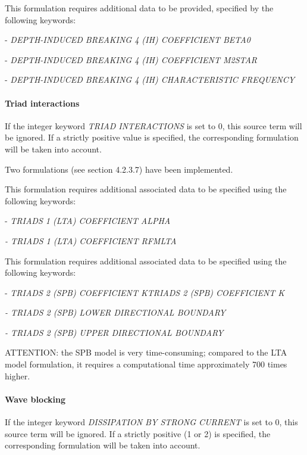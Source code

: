  This formulation requires additional data to be provided, specified by the following keywords:

 - \textit{DEPTH-INDUCED BREAKING 4 (IH) COEFFICIENT BETA0}

 - \textit{DEPTH-INDUCED BREAKING 4 (IH) COEFFICIENT M2STAR}

 - \textit{DEPTH-INDUCED BREAKING 4 (IH) CHARACTERISTIC FREQUENCY}

\paragraph{ Triad interactions}

 If the integer keyword \textit{TRIAD INTERACTIONS} is set to 0, this source term will be ignored. If a strictly positive value is specified, the corresponding formulation will be taken into account.

 Two formulations (see section 4.2.3.7) have been implemented.

 \textbf{}

 This formulation requires additional associated data to be specified using the following keywords:

 - \textit{TRIADS 1 (LTA) COEFFICIENT ALPHA }

 \textit{- TRIADS 1 (LTA) COEFFICIENT RFMLTA }

 \textbf{}

 \textbf{}

 This formulation requires additional associated data to be specified using the following keywords:

 - \textit{TRIADS 2 (SPB) COEFFICIENT KTRIADS 2 (SPB) COEFFICIENT K}

 \textit{- TRIADS 2 (SPB) LOWER DIRECTIONAL BOUNDARY}

 \textit{- TRIADS 2 (SPB) UPPER DIRECTIONAL BOUNDARY}

 ATTENTION: the SPB model is very time-consuming; compared to the LTA model formulation, it requires a computational time approximately 700 times higher.


\paragraph{ Wave blocking }

 If the integer keyword \textit{DISSIPATION BY STRONG CURRENT} is set to 0, this source term will be ignored. If a strictly positive (1 or 2) is specified, the corresponding formulation will be taken into account.

